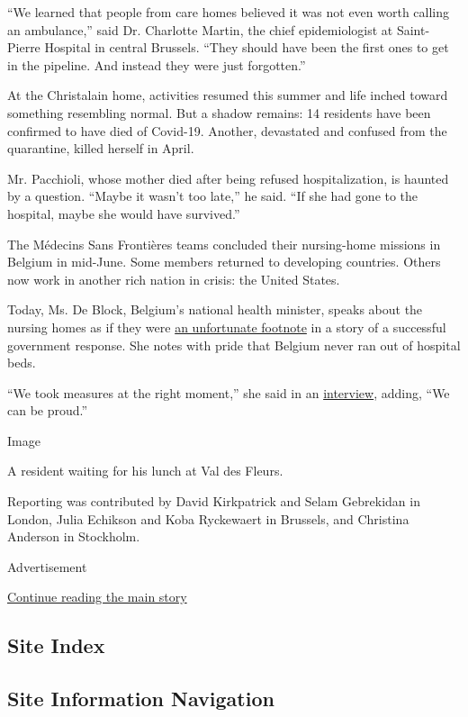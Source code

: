 ``We learned that people from care homes believed it was not even worth
calling an ambulance,'' said Dr. Charlotte Martin, the chief
epidemiologist at Saint-Pierre Hospital in central Brussels. ``They
should have been the first ones to get in the pipeline. And instead they
were just forgotten.''

At the Christalain home, activities resumed this summer and life inched
toward something resembling normal. But a shadow remains: 14 residents
have been confirmed to have died of Covid-19. Another, devastated and
confused from the quarantine, killed herself in April.

Mr. Pacchioli, whose mother died after being refused hospitalization, is
haunted by a question. ``Maybe it wasn't too late,'' he said. ``If she
had gone to the hospital, maybe she would have survived.''

The Médecins Sans Frontières teams concluded their nursing-home missions
in Belgium in mid-June. Some members returned to developing countries.
Others now work in another rich nation in crisis: the United States.

Today, Ms. De Block, Belgium's national health minister, speaks about
the nursing homes as if they were
\href{https://www.politico.eu/article/in-defense-of-belgium-coronavirus-covid19-pandemic-response/}{an
unfortunate footnote} in a story of a successful government response.
She notes with pride that Belgium never ran out of hospital beds.

``We took measures at the right moment,'' she said in an
\href{https://www.nieuwsblad.be/cnt/dmf20200528_04974067}{interview},
adding, ``We can be proud.''

Image

A resident waiting for his lunch at Val des Fleurs.

Reporting was contributed by David Kirkpatrick and Selam Gebrekidan in
London, Julia Echikson and Koba Ryckewaert in Brussels, and Christina
Anderson in Stockholm.

Advertisement

\protect\hyperlink{after-bottom}{Continue reading the main story}

\hypertarget{site-index}{%
\subsection{Site Index}\label{site-index}}

\hypertarget{site-information-navigation}{%
\subsection{Site Information
Navigation}\label{site-information-navigation}}

